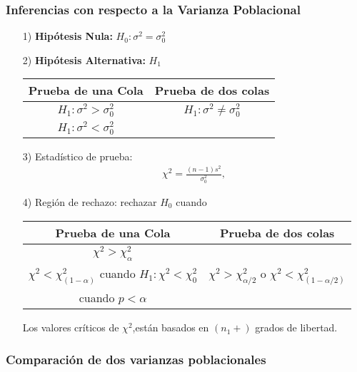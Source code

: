 \documentclass[a4paper]{report} %
\begin{document}
\subsubsection{Inferencias con respecto a la Varianza Poblacional}
\begin{itemize}
\item[1) ] \textbf{Hip\'otesis Nula:} $H_{0}:\sigma^{2}=\sigma^{2}_{0}$
\item[2) ] \textbf{Hip\'otesis Alternativa: } $H_{1}$
\begin{center}
\begin{tabular}{cc}\hline
\textbf{Prueba de una Cola} & \textbf{Prueba de dos colas}\\\hline
$H_{1}:\sigma^{2}>\sigma^{2}_{0}$ & $H_{1}:\sigma^{2}\neq \sigma^{2}_{0}$\\ 
$H_{1}:\sigma^{2}<\sigma^{2}_{0}$&\\
\end{tabular}
\end{center}
\item[3) ] Estad\'istico de prueba:
\begin{eqnarray}
\chi^{2}=\frac{\left(n-1\right)s^{2}}{\sigma^{2}_{0}},
\end{eqnarray}
\item[4) ] Regi\'on de rechazo: rechazar $H_{0}$ cuando
\begin{center}
\begin{tabular}{cc}\hline
\textbf{Prueba de una Cola} & \textbf{Prueba de dos colas}\\\hline
$\chi^{2}>\chi^{2}_{\alpha}$ & \\
$\chi^{2}<\chi^{2}_{\left(1-\alpha\right)}$ cuando $H_{1}:\chi^{2}<\chi^{2}_{0}$&$\chi^{2}>\chi^{2}_{\alpha/2}$ o $\chi^{2}<\chi^{2}_{\left(1-\alpha/2\right)}$\\
 cuando $p<\alpha$&\\
\end{tabular}
\end{center}

Los valores cr\'iticos de $\chi^{2}$,est\'an basados en $\left(n_{1}+\right)$ grados de libertad.

\end{itemize}

\subsubsection{Comparaci\'on de dos varianzas poblacionales}
\end{document}
